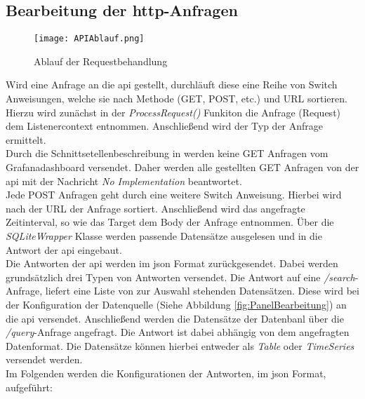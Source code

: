 \subsection{Bearbeitung der \ac{http}-Anfragen}
\begin{wrapfigure}{r}{0.55\textwidth}
    \vspace{-1.2cm}
    \begin{center}
      \texttt{[image: APIAblauf.png]}
    \end{center}
    \vspace{-0.5cm}
    \caption{Ablauf der Requestbehandlung}
    \label{fig:APIAblauf}
    \vspace{-0.5cm}
  \end{wrapfigure}
Wird eine Anfrage an die \ac{api} gestellt, durchläuft diese eine Reihe von Switch Anweisungen, welche sie nach Methode (GET, POST, etc.) und URL sortieren. Hierzu wird zunächst in der \textit{ProcessRequest()} Funkiton die Anfrage (Request) dem Listenercontext entnommen. Anschließend wird der Typ der Anfrage ermittelt.\\
Durch die Schnittsetellenbeschreibung in \cite{SimpleJSON} werden keine GET Anfragen vom Grafanadashboard versendet. Daher werden alle gestellten GET Anfragen von der \ac{api} mit der Nachricht \glqq\textit{No Implementation}\grqq{} beantwortet.\\
Jede POST Anfragen geht durch eine weitere Switch Anweisung. Hierbei wird nach der URL der Anfrage sortiert. Anschließend wird das angefragte Zeitinterval, so wie das Target dem Body der Anfrage entnommen. Über die \textit{SQLiteWrapper} Klasse werden passende Datensätze ausgelesen und in die Antwort der \ac{api} eingebaut.\\   
Die Antworten der \ac{api} werden im \ac{json} Format zurückgesendet. Dabei werden grundsätzlich drei Typen von Antworten versendet. Die Antwort auf eine \textit{/search}-Anfrage, liefert eine Liste von zur Auswahl stehenden Datensätzen. Diese wird bei der Konfiguration der Datenquelle (Siehe Abbildung \ref{fig:PanelBearbeitung}) an die \ac{api} versendet. Anschließend werden die Datensätze der Datenbanl über die \textit{/query}-Anfrage angefragt. Die Antwort ist dabei abhängig von dem angefragten Datenformat. Die Datensätze können hierbei entweder als \textit{Table} oder \textit{TimeSeries} versendet werden.\\
Im Folgenden werden die Konfigurationen der Antworten, im \ac{json} Format, aufgeführt:
